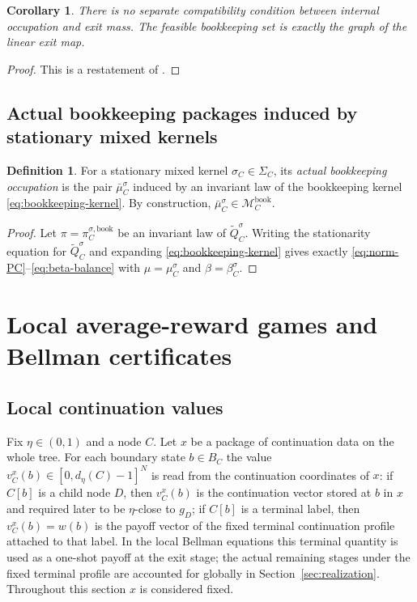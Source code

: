 \documentclass[12pt]{article}
\newtheorem{corollary}[theorem]{Corollary}
\theoremstyle{definition}
\newtheorem{definition}[theorem]{Definition}
\newcommand{\1}{\mathbf{1}}
\newcommand{\cM}{\mathcal{M}}
\begin{document}
\begin{corollary}
\label{cor:no-vp3}
There is no separate compatibility condition between internal occupation and exit
mass. The feasible bookkeeping set is exactly the graph of the linear exit map.
\end{corollary}

\begin{proof}
This is a restatement of .
\end{proof}

\subsection{Actual bookkeeping packages induced by stationary mixed kernels}

\begin{definition}
\label{def:actual-local-package}
For a stationary mixed kernel $\sigma_C\in\Sigma_C$, its \emph{actual bookkeeping
occupation} is the pair $\bar\mu_C^{\sigma}$ induced by an invariant law of the
bookkeeping kernel \eqref{eq:bookkeeping-kernel}. By construction,
$\bar\mu_C^{\sigma}\in \cM_C^{\mathrm{book}}$.
\end{definition}

\begin{proof}
Let $\pi=\pi_C^{\sigma,\mathrm{book}}$ be an invariant law of
$\widetilde Q_C^{\sigma}$. Writing the stationarity equation for
$\widetilde Q_C^{\sigma}$ and expanding \eqref{eq:bookkeeping-kernel} gives
exactly \eqref{eq:norm-PC}--\eqref{eq:beta-balance} with
$\mu=\mu_C^{\sigma}$ and $\beta=\beta_C^{\sigma}$.
\end{proof}

\section{Local average-reward games and Bellman certificates}
\label{sec:local}

\subsection{Local continuation values}

Fix $\eta\in(0,1)$ and a node $C$. Let $x$ be a package of continuation data on the
whole tree. For each boundary state $b\in B_C$ the value
$v_C^x(b)\in[0,d_\eta(C)-1]^N$ is read from the continuation coordinates of $x$:
if $C[b]$ is a child node $D$, then $v_C^x(b)$ is the continuation vector stored
at $b$ in $x$ and required later to be $\eta$-close to $g_D$; if $C[b]$ is a
terminal label, then $v_C^x(b)=w(b)$ is the payoff vector of the fixed terminal
continuation profile attached to that label. In the local Bellman equations this
terminal quantity is used as a one-shot payoff at the exit stage; the actual
remaining stages under the fixed terminal profile are accounted for globally in
Section~\ref{sec:realization}. Throughout this section $x$ is considered fixed.
\end{document}
